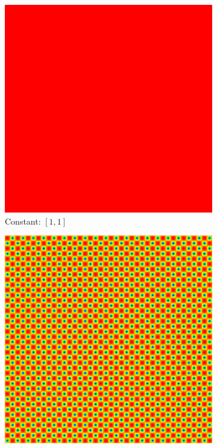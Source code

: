 \documentclass[11pt]{article}       %
\begin{document}
\begin{figure}%
	\centering
	\begin{subfigure}[b]{.4\columnwidth}
		\includegraphics[width=\textwidth]{Figures/speed_constant}
		\caption{Constant: $[1, 1]$}
	\end{subfigure}
	\begin{subfigure}[b]{.4\columnwidth}
		\includegraphics[width=\textwidth]{Figures/speed_sin_checkerboard_s}

\end{subfigure}
\end{figure}
\end{document}
